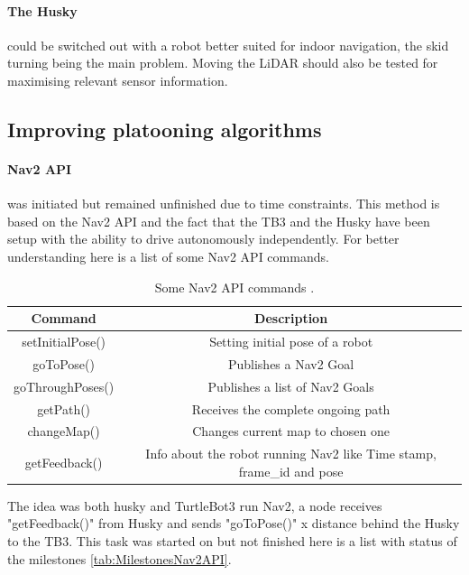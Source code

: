 \paragraph{The Husky} could be switched out with a robot better suited for indoor navigation, the skid turning being the main problem. Moving the LiDAR should also be tested for maximising relevant sensor information. 

\subsection{Improving platooning algorithms}

\paragraph{Nav2 API} \label{Further_work_Nav2_API} was initiated but remained unfinished due to time constraints. This method is based on the Nav2 API and the fact that the TB3 and the Husky have been setup with the ability to drive autonomously independently. For better understanding here is a list of some Nav2 API commands.

\begin{table}[H]
    \centering
    \caption{Some Nav2 API commands \cite{rosnavAPI}.}
    \begin{tabular}{c|c}
        Command             & Description \\ \hline
        setInitialPose()    & Setting initial pose of a robot \\
        goToPose()          & Publishes a Nav2 Goal \\
        goThroughPoses()    & Publishes a list of Nav2 Goals \\
        getPath()           & Receives the complete ongoing path \\
        changeMap()         & Changes current map to chosen one \\
        getFeedback() & Info about the robot running Nav2 like Time stamp, frame\_id and pose\\
    \end{tabular}
    \label{tab:Nav2API}
\end{table}

The idea was both husky and TurtleBot3 run Nav2, a node receives "getFeedback()" from Husky and sends "goToPose()" x distance behind the Husky to the TB3. This task was started on but not finished here is a list with status of the milestones \ref{tab:MilestonesNav2API}.

